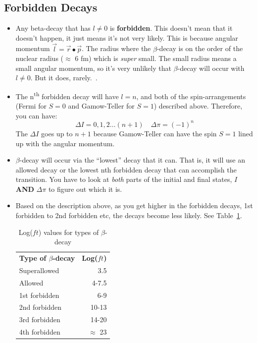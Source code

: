 \documentclass[letter]{article}
\begin{document}
\subsection{Forbidden Decays}

\begin{itemize}
\item Any beta-decay that has $l \neq 0$ is \textbf{forbidden}. This
  doesn't mean that it doesn't happen, it just means it's not very
  likely. This is because angular momentum $\vec{l} =
  \vec{r}\bullet\vec{p}$. The radius where the $\beta$-decay is on the
  order of the nuclear radius ($\approx$ 6 fm) which is \textit{super}
  small. The small radius means a small angular momentum, so it's very
  unlikely that $\beta$-decay will occur with $l \neq 0$. But it does,
  rarely.~\cite[Lec. 19-21]{lecture}.
\item The n\textsuperscript{th} forbidden decay will have $l=n$, and both of the
  spin-arrangements (Fermi for $S=0$ and Gamow-Teller for $S=1$)
  described above. Therefore, you can have:
  \begin{equation*}
    \Delta{}I=0,1,2\ldots(n+1) \quad \Delta\pi = (-1)^n
  \end{equation*}
The $\Delta{}I$ goes up to $n+1$ because Gamow-Teller can have the
spin $S=1$ lined up with the angular
momentum.~\cite[pp.291,Lec.19-21]{krane,lecture}
\item $\beta$-decay will occur via the ``lowest'' decay that it
  can. That is, it will use an allowed decay or the lowest nth
  forbidden decay that can accomplish the transition. You have to look
  at \textit{both} parts of the initial and final states, $I$
  \textbf{AND} $\Delta\pi$ to figure out which it is.~\cite[Lec 19-21]{lecture}
\item Based on the description above, as you get higher in the
  forbidden decays, 1st forbidden to 2nd forbidden etc, the decays
  become less likely. See Table~\ref{tab:logft}.~\cite[Lec. 19-21]{lecture}
\begin{table}[hbt]
\centering
\begin{tabular}{lr}
\textbf{Type of $\beta$-decay} & \textbf{Log($ft$)} \\
Superallowed                   & 3.5                \\
Allowed                        & 4-7.5              \\
1st forbidden                  & 6-9                \\
2nd forbidden                  & 10-13              \\
3rd forbidden                  & 14-20              \\
4th forbidden                  & $\approx$ 23      
\end{tabular}
\caption{Log($ft$) values for types of $\beta$-decay}
\label{tab:logft}
\end{table}
\end{itemize}
\end{document}
